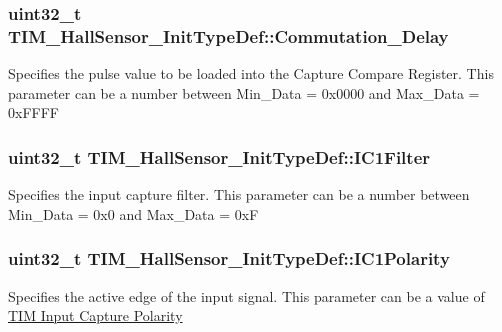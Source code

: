 \subsubsection[{\texorpdfstring{Commutation\+\_\+\+Delay}{Commutation_Delay}}]{\setlength{\rightskip}{0pt plus 5cm}uint32\+\_\+t T\+I\+M\+\_\+\+Hall\+Sensor\+\_\+\+Init\+Type\+Def\+::\+Commutation\+\_\+\+Delay}\hypertarget{struct_t_i_m___hall_sensor___init_type_def_a822efefca8a13af284e84070bd19bb91}{}\label{struct_t_i_m___hall_sensor___init_type_def_a822efefca8a13af284e84070bd19bb91}
Specifies the pulse value to be loaded into the Capture Compare Register. This parameter can be a number between Min\+\_\+\+Data = 0x0000 and Max\+\_\+\+Data = 0x\+F\+F\+FF 
\subsubsection[{\texorpdfstring{I\+C1\+Filter}{IC1Filter}}]{\setlength{\rightskip}{0pt plus 5cm}uint32\+\_\+t T\+I\+M\+\_\+\+Hall\+Sensor\+\_\+\+Init\+Type\+Def\+::\+I\+C1\+Filter}\hypertarget{struct_t_i_m___hall_sensor___init_type_def_a2d349ca17282be59dd09dc9b10948d24}{}\label{struct_t_i_m___hall_sensor___init_type_def_a2d349ca17282be59dd09dc9b10948d24}
Specifies the input capture filter. This parameter can be a number between Min\+\_\+\+Data = 0x0 and Max\+\_\+\+Data = 0xF 
\subsubsection[{\texorpdfstring{I\+C1\+Polarity}{IC1Polarity}}]{\setlength{\rightskip}{0pt plus 5cm}uint32\+\_\+t T\+I\+M\+\_\+\+Hall\+Sensor\+\_\+\+Init\+Type\+Def\+::\+I\+C1\+Polarity}\hypertarget{struct_t_i_m___hall_sensor___init_type_def_a08e8f098cb51159344135bab57d82d85}{}\label{struct_t_i_m___hall_sensor___init_type_def_a08e8f098cb51159344135bab57d82d85}
Specifies the active edge of the input signal. This parameter can be a value of \hyperlink{group___t_i_m___input___capture___polarity}{T\+IM Input Capture Polarity} 
